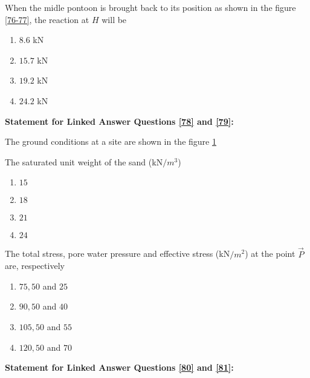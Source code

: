             \item \label{77} When the midle pontoon is brought back to its position as shown in the figure \ref{76-77}, the reaction at $H$ will be
                \begin{enumerate}
                    \item $8.6$ kN
                    \item $15.7$ kN
                    \item $19.2$ kN
                    \item $24.2$ kN
                \end{enumerate}

    \item[] \textbf{Statement for Linked Answer Questions \ref{78} and \ref{79}:}

    The ground conditions at a site are shown in the figure \ref{78-79}
    \begin{figure}[H]
        \centering
        
        \caption{}
        \label{78-79}
    \end{figure}

    \item \label{78} The saturated unit weight of the sand (kN$/m^3$)
        \begin{enumerate}
            \item $15$
            \item $18$
            \item $21$
            \item $24$
        \end{enumerate}

    \item \label{79} The total stress, pore water pressure and effective stress (kN$/m^2$) at the point $\vec{P}$ are, respectively
        \begin{enumerate}
            \item $75,50$ and $25$
            \item $90,50$ and $40$
            \item $105,50$ and $55$
            \item $120,50$ and $70$
        \end{enumerate}
    \item[] \textbf{Statement for Linked Answer Questions \ref{80} and \ref{81}:}

